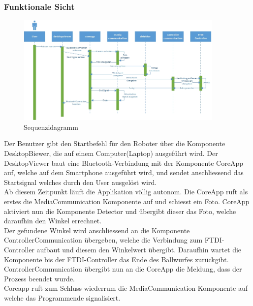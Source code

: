	\subsubsection{Funktionale Sicht}
	
	\begin{figure}[h!]
		\centering
		\includegraphics[width=0.9\textwidth]{Enddokumentation/Loesungskonzept/Bilder/Sequenzdiagramm.jpg}
		\caption{Sequenzidagramm}		
	\end{figure}
Der Benutzer gibt den Startbefehl für den Roboter über die Komponente DesktopBiewer, die auf einem Computer(Laptop) ausgeführt wird. Der DesktopViewer baut eine Bluetooth-Verbindung mit der Komponente CoreApp auf, welche auf dem Smartphone ausgeführt wird, und sendet anschliessend das Startsignal welches durch den User ausgelöst wird. \\
Ab diesem Zeitpunkt läuft die Applikation völlig autonom. Die CoreApp ruft als erstes die MediaCommunication Komponente auf und schiesst ein Foto. CoreApp aktiviert nun die Komponente Detector und übergibt dieser das Foto, welche daraufhin den Winkel errechnet.\\
Der gefundene Winkel wird anschliessend an die Komponente ControllerCommunication übergeben, welche die Verbindung zum FTDI-Controller aufbaut und diesem den Winkelwert übergibt. Daraufhin wartet die Komponente bis der FTDI-Controller das Ende des Ballwurfes zurückgibt. ControllerCommunication übergibt nun an die CoreApp die Meldung, dass der Prozess beendet wurde. \\
Coreapp ruft zum Schluss wiederrum die MediaCommunication Komponente auf welche das Programmende signalisiert.
		
		
